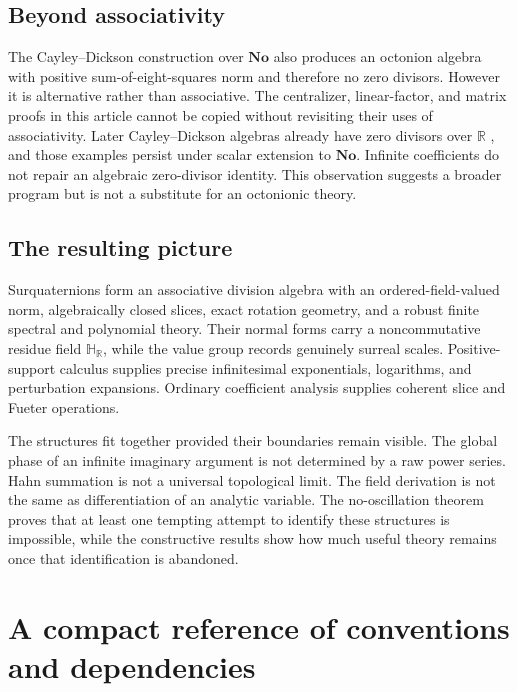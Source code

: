 \documentclass[11pt,letterpaper]{article}
\numberwithin{equation}{section}
\theoremstyle{definition}
\theoremstyle{remark}
\newcommand{\No}{\mathbf{No}}
\newcommand{\HR}{\mathbb H_{\mathbb R}}
\newcommand{\R}{\mathbb R}
\begin{document}
\subsection{Beyond associativity}
The Cayley--Dickson construction over $\No$ also produces an octonion algebra with positive
sum-of-eight-squares norm and therefore no zero divisors. However it is alternative rather
than associative. The centralizer, linear-factor, and matrix proofs in this article cannot
be copied without revisiting their uses of associativity. Later Cayley--Dickson algebras
already have zero divisors over $\R$ \cite{Baez}, and those examples persist under scalar extension to
$\No$. Infinite coefficients do not repair an algebraic zero-divisor identity.
This observation suggests a broader program but is not a substitute for an octonionic theory.

\subsection{The resulting picture}
Surquaternions form an associative division algebra with an ordered-field-valued norm,
algebraically closed slices, exact rotation geometry, and a robust finite spectral and
polynomial theory. Their normal forms carry a noncommutative residue field $\HR$, while the
value group records genuinely surreal scales. Positive-support calculus supplies precise
infinitesimal exponentials, logarithms, and perturbation expansions. Ordinary coefficient
analysis supplies coherent slice and Fueter operations.

The structures fit together provided their boundaries remain visible. The global phase of
an infinite imaginary argument is not determined by a raw power series. Hahn summation is
not a universal topological limit. The field derivation is not the same as differentiation of
an analytic variable. The no-oscillation theorem proves that at least one tempting attempt to
identify these structures is impossible, while the constructive results show how much useful
theory remains once that identification is abandoned.

\appendix
\section{A compact reference of conventions and dependencies}\label{app:ledger}
\end{document}
